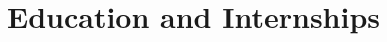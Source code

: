 \documentclass[10pt, a4paper]{article}
\newcommand{\years}[1]{\marginnote{\normalsize #1}}
\begin{document}



\section*{Education and Internships}
\noindent
\end{document}
